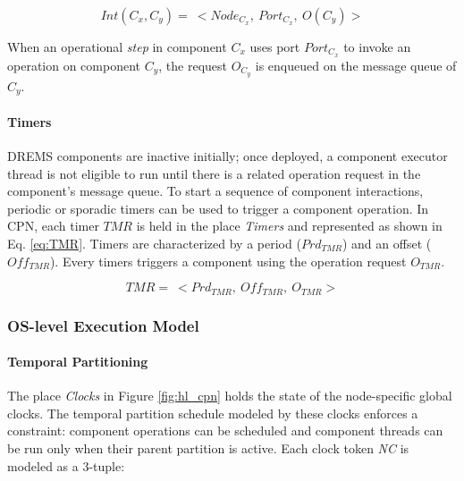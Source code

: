 \vspace{-0.15in}
\begin{equation}
\label{eq:component_interactions}
Int(C_x, C_y) = \ < Node_{C_x}, \ Port_{C_x}, \ O(C_y)>
\end{equation}

When an operational \emph{step} in component $C_x$ uses port $Port_{C_x}$ to invoke an operation on component $C_y$, the request $O_{C_y}$ is enqueued on the message queue of $C_y$. %

\paragraph{Timers}

DREMS components are inactive initially; once deployed, a component executor thread is not eligible to run until there is a related operation request in the component's message queue. To start a sequence of component interactions, periodic or sporadic timers can be used to trigger a component operation. In CPN, each timer $TMR$ is held in the place \emph{Timers} and represented as shown in Eq. \ref{eq:TMR}. Timers are characterized by a period ($Prd_{TMR}$) and an offset ($Off_{TMR}$). Every timers triggers a component using the operation request $O_{TMR}$.

\vspace{-0.15in}
\begin{equation}
\label{eq:TMR}
TMR = \ < Prd_{TMR}, \ Off_{TMR}, \ O_{TMR}>
\end{equation}

\subsubsection{OS-level Execution Model}

\paragraph{Temporal Partitioning}
The place \emph{Clocks} in Figure \ref{fig:hl_cpn} holds the state of the node-specific global clocks. The temporal partition schedule modeled by these clocks enforces a constraint: component operations can be scheduled and component threads can be run only when their parent partition is active. Each clock token \emph{NC} is modeled as a 3-tuple:

